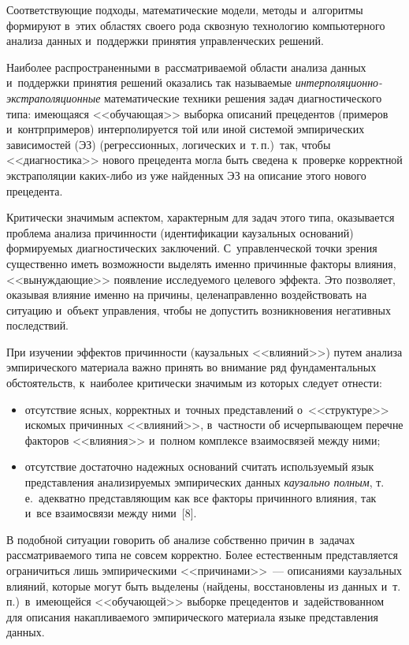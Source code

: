 \begin{multicols}{2}
  Соответствующие подходы, математические модели, методы и~алгоритмы 
формируют в~этих областях своего рода сквозную технологию компьютерного 
анализа данных и~поддержки принятия управленческих решений.
  
  Наиболее распространенными в~рас\-смат\-ри\-ва\-емой области анализа данных 
и~поддержки принятия решений оказались так называемые  
\textit{ин\-тер\-по\-ля\-ци\-он\-но-экстра\-по\-ля\-ци\-он\-ные} математические 
\mbox{техники} решения задач диагностического типа: име\-юща\-яся <<обучающая>> 
выборка описаний прецедентов (примеров и~контрпримеров) интерполируется той 
или иной сис\-те\-мой эмпирических зависимостей (ЭЗ) (регрессионных, логических 
и~т.\,п.)\ так, чтобы <<диагностика>> нового прецедента могла быть сведена 
к~проверке корректной экстраполяции ка\-ких-ли\-бо из уже найденных ЭЗ на 
описание этого нового прецедента. 
  
  Критически значимым аспектом, характерным для задач этого типа, 
оказывается проблема анализа причинности (идентификации каузальных 
оснований) формируемых диагностических заключений. С~управленческой точки 
зрения существенно иметь возможности выделять именно причинные факторы 
влияния, <<вынуждающие>> появление исследуемого целевого эффекта. Это 
позволяет, оказывая влияние именно на причины, целенаправленно 
воздействовать на ситуацию и~объект управления, чтобы не допустить 
возникновения негативных последствий.
  
  При изучении эффектов причинности (каузальных <<влияний>>) путем анализа 
эмпирического материала важно принять во внимание ряд фундаментальных 
обстоятельств, к~наиболее критически значимым из которых следует отнести:
  \begin{itemize}
\item отсутствие ясных, корректных и~точных представлений о~<<структуре>> 
искомых причинных <<влияний>>, в~частности об исчерпывающем перечне 
факторов <<влияния>> и~полном комплексе взаимосвязей между ними; 
\item  отсутствие достаточно надежных оснований считать используемый язык 
представления анализируемых эмпирических данных \textit{каузально 
полным}, т.\,е.\ адекватно представляющим как все факторы причинного 
влияния, так и~все взаимосвязи между ними~[8].
\end{itemize}

  В подобной ситуации говорить об анализе собственно причин в~задачах 
рассматриваемого типа не совсем корректно. Более естественным представляется 
ограничиться лишь эмпирическими <<причинами>>~--- описаниями каузальных 
влияний, которые могут быть выделены (найдены, восстановлены из данных 
и~т.\,п.)\ в~име\-ющей\-ся <<обучающей>> выборке прецедентов 
и~задействованном для описания накапливаемого эмпирического материала языке 
представления данных.
  

\end{multicols}
